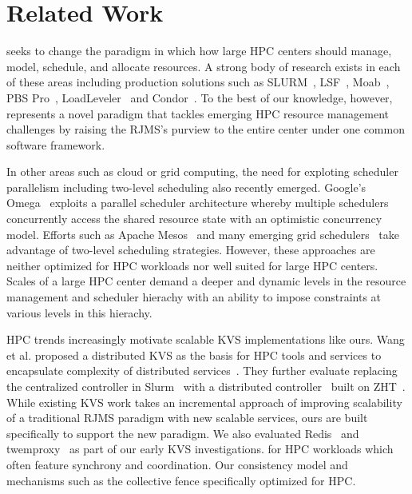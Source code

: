 \section{Related Work}
\flux seeks to change the paradigm in which 
how large HPC centers should manage, model, schedule, and
allocate resources. 
A strong body of research exists in each of these areas 
including production solutions such as SLURM~\cite{Jette02slurm}, 
LSF~\cite{LSF}, Moab~\cite{MOAB}, 
PBS Pro~\cite{PSBPro}, LoadLeveler~\cite{LL}
and Condor~\cite{Litzkow88}.
To the best of our knowledge, however, \flux represents a novel
paradigm that tackles emerging HPC resource management challenges 
by raising the RJMS's purview to the entire center 
under one common software framework. 

In other areas such as cloud or grid computing, the need 
for exploting scheduler parallelism including two-level 
scheduling also recently emerged. 
Google's Omega~\cite{Omega} exploits 
a parallel scheduler architecture whereby multiple
schedulers concurrently access the shared resource state
with an optimistic concurrency model. Efforts
such as Apache Mesos~\cite{Mesos} and many emerging
grid schedulers~\cite{MultilevelGrid,Oar} 
take advantage of two-level scheduling strategies.
However, these approaches are neither optimized for HPC workloads 
nor well suited for large HPC centers. 
Scales of a large HPC center demand a deeper 
and dynamic levels in the resource management 
and scheduler hierachy with an ability to impose constraints 
at various levels in this hierachy.

HPC trends increasingly motivate scalable KVS implementations 
like ours. Wang et al. proposed a distributed KVS 
as the basis for HPC tools and services to encapsulate
complexity of distributed services~\cite{Wang:2013:USE:2503210.2503239}.
%
They further evaluate replacing the centralized controller in
Slurm~\cite{Jette02slurm} with a distributed controller~\cite{Slurmpp}
built on ZHT~\cite{Li:2013:ZLR:2510661.2511401}.
While existing KVS work takes an incremental approach of improving 
scalability of a traditional RJMS paradigm with new scalable services,
ours are built specifically to support the new paradigm. 
We also evaluated Redis~\cite{Redis} and twemproxy~\cite{Twemproxy}
as part of our early KVS investigations.
for HPC workloads which often feature synchrony and coordination. 
Our consistency model and mechanisms such as the collective fence 
specifically optimized for HPC.


